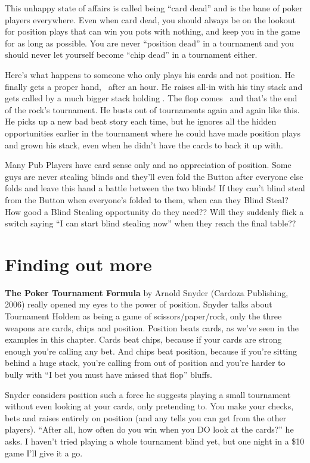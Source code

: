 This unhappy state of affairs is called being ``card dead'' and is
the bane of poker players everywhere. Even when card dead, you should always
be on the lookout for position plays that can win you pots with nothing,
and keep you in the game for as long as possible. You are never
``position dead'' in a tournament and you should never let yourself
become ``chip dead'' in a tournament either.

Here's what happens to someone who only plays his cards and not position.
He finally gets a proper hand, \tenh\tenc\ after an hour. He raises all-in
with his tiny stack and gets called by a much bigger stack
holding \Kd\Qd. The flop comes \Kh\sixc\trec\ and that's the
end of the rock's tournament. He busts out of tournaments again and
again like this. He picks up a new bad beat story each time, but he
ignores all the hidden opportunities earlier in the tournament
where he could have made position plays and grown his stack,
even when he didn't have the cards to back it up with.

Many Pub Players have card sense only and no appreciation of position.
Some guys are never stealing blinds and they'll even fold the
Button after everyone else folds and leave this hand a battle between the
two blinds! If they can't blind steal from the Button when everyone's
folded to them, when can they Blind Steal? How good a Blind Stealing
opportunity do they need?? Will they suddenly flick a switch saying
``I can start blind stealing now'' when they reach the final table??

\section{Finding out more}

\textbf{The Poker Tournament Formula} by Arnold Snyder
(Cardoza Publishing, 2006) really opened my eyes to the power of position.
Snyder talks about
Tournament Holdem as being a game of scissors/paper/rock, only the
three weapons are cards, chips and position. Position beats cards, as we've
seen in the examples in this chapter. Cards beat chips, because if your
cards are strong enough you're calling any bet. And chips beat position,
because if you're sitting behind a huge stack, you're calling
from out of position and you're harder to bully with ``I bet you
must have missed that flop'' bluffs.

Snyder considers position such a force he suggests playing a small
tournament without even looking at your cards, only pretending to. You make
your checks, bets and raises entirely on position (and any tells you can
get from the other players). ``After all, how often do you win when you
DO look at the cards?'' he asks. I haven't tried playing a whole tournament
blind yet, but one night in a \$10 game I'll give it a go.

